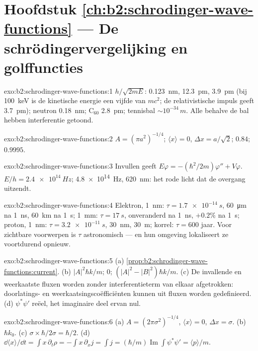 \section*{Hoofdstuk \ref{ch:b2:schrodinger-wave-functions} --- De
schrödingervergelijking en golffuncties}

\begin{solution}{exo:b2:schrodinger-wave-functions:1}
$h/\sqrt{2mE}$: \qty{0.123}{nm}, \qty{12.3}{pm}, \qty{3.9}{pm} (bij
\qty{100}{keV} is de
kinetische energie een vijfde van $mc^2$; de relativistische impuls geeft
\qty{3.7}{pm}); neutron \qty{0.18}{nm}; C$_{60}$ \qty{2.8}{pm}; tennisbal
$\sim 10^{-34}\,\unit{m}$. Alle behalve de bal hebben interferentie getoond.
\end{solution}

\begin{solution}{exo:b2:schrodinger-wave-functions:2}
$A = (\pi a^2)^{-1/4}$; $\langle x\rangle = 0$, $\Delta x = a/\sqrt2$;
$0.84$; $0.9995$.
\end{solution}

\begin{solution}{exo:b2:schrodinger-wave-functions:3}
Invullen geeft $E\varphi = -(\hbar^2/2m)\varphi'' + V\varphi$.
$E/h =
\qty{2.4e14}{Hz}$; \qty{4.8e14}{Hz}, \qty{620}{nm}: het rode licht
dat de overgang
uitzendt.
\end{solution}

\begin{solution}{exo:b2:schrodinger-wave-functions:4}
Elektron, \qty{1}{nm}: $\tau = \qty{1.7e-14}{s}$, \qty{60}{\micro m} na \qty{1}{ns},
\qty{60}{km} na \qty{1}{s}; \qty{1}{mm}: $\tau = \qty{17}{s}$, onveranderd
na \qty{1}{ns},
$+0.2\%$ na \qty{1}{s}; proton, \qty{1}{nm}: $\tau = \qty{3.2e-11}{s}$,
\qty{30}{nm},
\qty{30}{m}; korrel: $\tau = 600$ jaar. Voor zichtbare voorwerpen is $\tau$
astronomisch --- en hun omgeving lokaliseert ze voortdurend opnieuw.
\end{solution}

\begin{solution}{exo:b2:schrodinger-wave-functions:5}
(a) \cref{prop:b2:schrodinger-wave-functions:current}. (b) $|A|^2\hbar k/m$;
$0$; $(|A|^2 - |B|^2)\hbar k/m$. (c) De invallende en weerkaatste fluxen
worden zonder interferentieterm van elkaar afgetrokken: doorlatings- en
weerkaatsings\-coëfficiënten
kunnen uit fluxen worden gedefinieerd. (d) $\psi^*\psi'$ reëel, het
imaginaire deel ervan nul.
\end{solution}

\begin{solution}{exo:b2:schrodinger-wave-functions:6}
(a) $A = (2\pi\sigma^2)^{-1/4}$, $\langle x\rangle = 0$,
$\Delta x = \sigma$. (b) $\hbar k_0$.
(c) $\sigma \times \hbar/2\sigma = \hbar/2$. (d)
$\dd\langle x\rangle/\dd t = \int x\,
\partial_t\rho = -\int x\,\partial_xj = \int j = (\hbar/m)\operatorname{Im}\int\psi^*
\psi' = \langle p\rangle/m$.
\end{solution}

